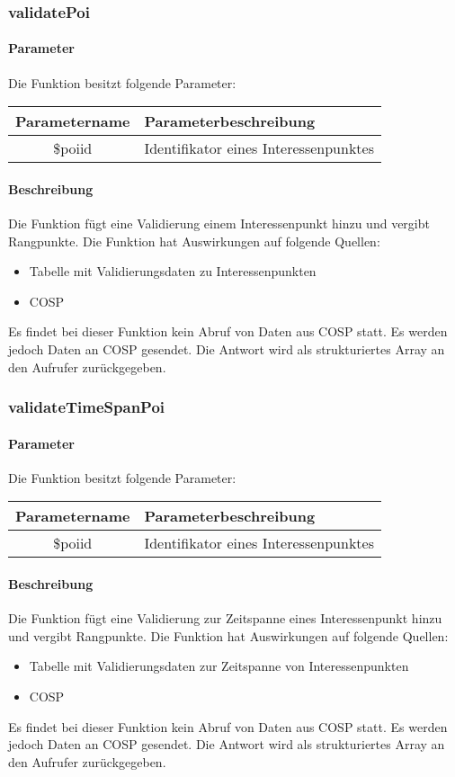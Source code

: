 \subsubsection{validatePoi}
\paragraph{Parameter} Die Funktion besitzt folgende Parameter:
\begin{table}[H]
	\begin{tabular}{|c|p{11cm}|}
		\hline
		\textbf{Parametername} & \textbf{Parameterbeschreibung} \\ \hline
		\$poiid & Identifikator eines Interessenpunktes \\ \hline
	\end{tabular}
\end{table}
\paragraph{Beschreibung} Die Funktion fügt eine Validierung einem Interessenpunkt hinzu und vergibt Rangpunkte. Die Funktion hat Auswirkungen auf folgende Quellen:
\begin{itemize}
	\item Tabelle mit Validierungsdaten zu Interessenpunkten
	\item COSP
\end{itemize}
Es findet bei dieser Funktion kein Abruf von Daten aus {\glqq COSP\grqq} statt. Es werden jedoch Daten an {\glqq COSP\grqq} gesendet. Die Antwort wird als strukturiertes Array an den Aufrufer zurückgegeben.
\subsubsection{validateTimeSpanPoi}
\paragraph{Parameter} Die Funktion besitzt folgende Parameter:
\begin{table}[H]
	\begin{tabular}{|c|p{11cm}|}
		\hline
		\textbf{Parametername} & \textbf{Parameterbeschreibung} \\ \hline
		\$poiid & Identifikator eines Interessenpunktes \\ \hline
	\end{tabular}
\end{table}
\paragraph{Beschreibung} Die Funktion fügt eine Validierung zur Zeitspanne eines Interessenpunkt hinzu und vergibt Rangpunkte. Die Funktion hat Auswirkungen auf folgende Quellen:
\begin{itemize}
	\item Tabelle mit Validierungsdaten zur Zeitspanne von Interessenpunkten
	\item COSP
\end{itemize}
Es findet bei dieser Funktion kein Abruf von Daten aus {\glqq COSP\grqq} statt. Es werden jedoch Daten an {\glqq COSP\grqq} gesendet. Die Antwort wird als strukturiertes Array an den Aufrufer zurückgegeben.
